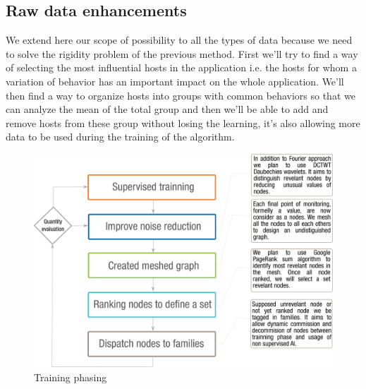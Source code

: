 \documentclass[10pt,a4paper,oneside]{article}
\begin{document}
\begin{multicols}{2}
\section{Raw data enhancements}
We extend here our scope of possibility to all the types of data because we need to solve the rigidity problem of the previous method. First we'll try to find a way of selecting the most influential hosts in the application i.e. the hosts for whom a variation of behavior has an important impact on the whole application. We'll then find a way to organize hosts into groups with common behaviors so that we can analyze the mean of the total group and then we'll be able to add and remove hosts from these group without losing the learning, it's also allowing more data to be used during the training of the algorithm.
\end{multicols}

\vspace{0.8cm}

\begin{figure}[!h]
\centering
\includegraphics[scale=0.8]{./images/Apprentissage_V2.png}
\caption{Training phasing}
\label{pop}
\end{figure}

\vspace{0.8cm}
\end{document}
